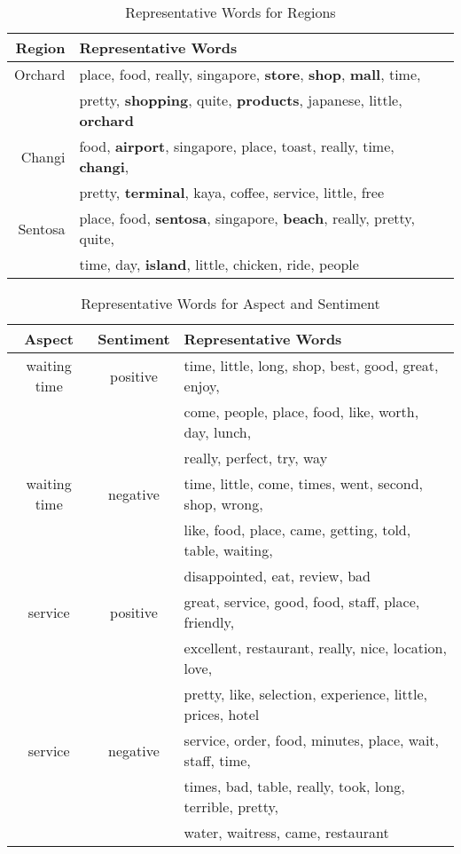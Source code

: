 \begin{table}
\centering
\caption{Representative Words for Regions}
\begin{tabular}{r|l}
\hline
Region & Representative Words \\
\hline
Orchard &  place, food, really, singapore, \textbf{store}, \textbf{shop}, \textbf{mall}, time, \\
& pretty, \textbf{shopping}, quite, \textbf{products}, japanese, little, \textbf{orchard}  \\
\hline
Changi &  food, \textbf{airport}, singapore, place, toast, really, time, \textbf{changi}, \\
& pretty, \textbf{terminal}, kaya, coffee, service, little, free \\
\hline
Sentosa &  place, food, \textbf{sentosa}, singapore, \textbf{beach}, really, pretty, quite, \\
& time, day, \textbf{island}, little, chicken, ride, people \\
\hline
\end{tabular}
\label{tab:region}
\end{table}

\begin{table}
\centering
\caption{Representative Words for Aspect and Sentiment}
\begin{tabular}{c|c|l}
\hline
Aspect & Sentiment & Representative Words\\
\hline
waiting time &  positive &  time, little, long, shop, best, good, great, enjoy, \\
& & come, people,  place, food, like, worth, day, lunch, \\
& & really, perfect, try, way \\
\hline
waiting time &  negative &  time, little, come, times, went, second, shop, wrong, \\
& & like, food, place, came, getting, told, table, waiting, \\
& &disappointed, eat, review, bad \\
\hline
service &  positive &  great, service, good, food, staff, place, friendly, \\
& & excellent, restaurant, really, nice, location, love,  \\
& & pretty, like, selection, experience, little, prices, hotel\\
\hline
service &  negative &  service, order, food, minutes, place, wait, staff, time,\\ 
& & times, bad, table, really, took, long, terrible, pretty, \\
& & water, waitress, came, restaurant\\
\hline
\end{tabular}
\label{tab:aspect}
\end{table}

